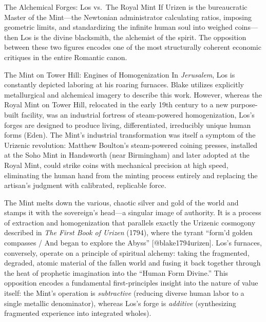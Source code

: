 \documentclass[
  ignorenonframetext,
]{beamer}
\author{\texorpdfstring{}{}}
\date{}
\begin{document}
\begin{frame}{The Alchemical Forges: Los vs.~The Royal Mint}
\protect{}\label{the-alchemical-forges-los-vs.-the-royal-mint}
If Urizen is the bureaucratic Master of the Mint---the Newtonian
administrator calculating ratios, imposing geometric limits, and
standardizing the infinite human soul into weighed coins---then Los is
the divine blacksmith, the alchemist of the spirit. The opposition
between these two figures encodes one of the most structurally coherent
economic critiques in the entire Romantic canon.

\begin{block}{The Mint on Tower Hill: Engines of Homogenization}
\protect{}\label{the-mint-on-tower-hill-engines-of-homogenization}
In \emph{Jerusalem}, Los is constantly depicted laboring at his roaring
furnaces. Blake utilizes explicitly metallurgical and alchemical imagery
to describe this work. However, whereas the Royal Mint on Tower Hill,
relocated in the early 19th century to a new purpose-built facility, was
an industrial fortress of steam-powered homogenization, Los's forges are
designed to produce living, differentiated, irreducibly unique human
forms (Eden). The Mint's industrial transformation was itself a symptom
of the Urizenic revolution: Matthew Boulton's steam-powered coining
presses, installed at the Soho Mint in Handsworth (near Birmingham) and
later adopted at the Royal Mint, could strike coins with mechanical
precision at high speed, eliminating the human hand from the minting
process entirely and replacing the artisan's judgment with calibrated,
replicable force.

The Mint melts down the various, chaotic silver and gold of the world
and stamps it with the sovereign's head---a singular image of authority.
It is a process of extraction and homogenization that parallels exactly
the Urizenic cosmogony described in \emph{The First Book of Urizen}
(1794), where the tyrant ``form'd golden compasses / And began to
explore the Abyss'' {[}@blake1794urizen{]}. Los's furnaces, conversely,
operate on a principle of spiritual alchemy: taking the fragmented,
degraded, atomic material of the fallen world and fusing it back
together through the heat of prophetic imagination into the ``Human Form
Divine.'' This opposition encodes a fundamental first-principles insight
into the nature of value itself: the Mint's operation is
\emph{subtractive} (reducing diverse human labor to a single metallic
denominator), whereas Los's forge is \emph{additive} (synthesizing
fragmented experience into integrated wholes).


\end{block}
\end{frame}
\end{document}

